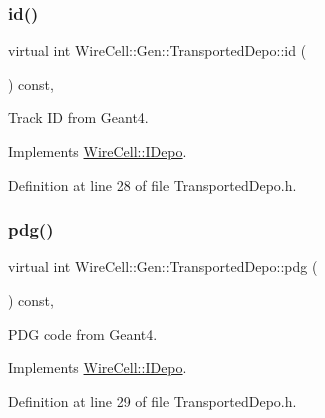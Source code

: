 \subsubsection{\texorpdfstring{id()}{id()}}
{\footnotesize\ttfamily virtual int Wire\+Cell\+::\+Gen\+::\+Transported\+Depo\+::id (\begin{DoxyParamCaption}{ }\end{DoxyParamCaption}) const\hspace{0.3cm}{\ttfamily [inline]}, {\ttfamily [virtual]}}



Track ID from Geant4. 



Implements \hyperlink{class_wire_cell_1_1_i_depo_ab32caab0a418f3fc0f185d8fc316537a}{Wire\+Cell\+::\+I\+Depo}.



Definition at line 28 of file Transported\+Depo.\+h.

\mbox{\label{class_wire_cell_1_1_gen_1_1_transported_depo_aa03cc0948c471aa8116e8ec62e284cea}} 
\subsubsection{\texorpdfstring{pdg()}{pdg()}}
{\footnotesize\ttfamily virtual int Wire\+Cell\+::\+Gen\+::\+Transported\+Depo\+::pdg (\begin{DoxyParamCaption}{ }\end{DoxyParamCaption}) const\hspace{0.3cm}{\ttfamily [inline]}, {\ttfamily [virtual]}}



P\+DG code from Geant4. 



Implements \hyperlink{class_wire_cell_1_1_i_depo_a3a7a83ccfde95f79761cec6562fff82b}{Wire\+Cell\+::\+I\+Depo}.



Definition at line 29 of file Transported\+Depo.\+h.

\mbox{\label{class_wire_cell_1_1_gen_1_1_transported_depo_adc6089147221a0e27445f167969bd26d}} 
